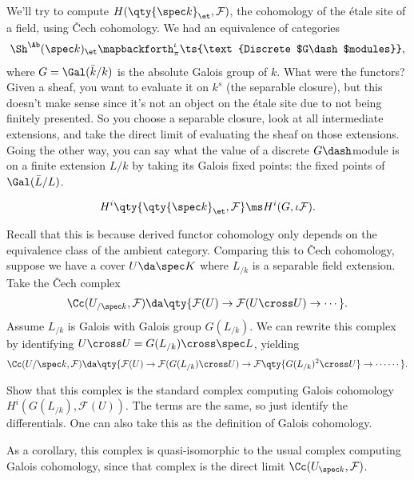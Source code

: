 \begin{example}[?]

We'll try to compute \(H(\qty{\spec k}_\et, \mathcal{F})\), the
cohomology of the étale site of a field, using Čech cohomology. We had
an equivalence of categories
\begin{align*}  
\Sh^\Ab(\spec k)_\et \mapbackforth^{\iota}_{\pi} \ts{\text{Discrete $G\dash$modules}}
,\end{align*} where \(G = \Gal(\bar k / k)\) is the absolute Galois
group of \(k\). What were the functors? Given a sheaf, you want to
evaluate it on \(k^s\) (the separable closure), but this doesn't make
sense since it's not an object on the étale site due to not being
finitely presented. So you choose a separable closure, look at all
intermediate extensions, and take the direct limit of evaluating the
sheaf on those extensions. Going the other way, you can say what the
value of a discrete \(G\dash\)module is on a finite extension \(L/k\) by
taking its Galois fixed points: the fixed points of \(\Gal(\bar L/L)\).

\begin{corollary}[?]

\begin{align*}  
H^i\qty{\qty{ \spec k}_\et, \mathcal{F}} \ms H^i(G, \iota \mathcal{F})
.\end{align*}

\end{corollary}

Recall that this is because derived functor cohomology only depends on
the equivalence class of the ambient category. Comparing this to Čech
cohomology, suppose we have a cover \(U \da \spec K\) where \(L_{/k}\)
is a separable field extension. Take the Čech complex
\begin{align*}  
\Cc(U_{/\spec k}, \mathcal{F}) \da \qty{\mathcal{F}(U) \to \mathcal{F}(U\cross U) \to \cdots}
.\end{align*} Assume \(L_{/k}\) is Galois with Galois group
\(G(L_{/k})\). We can rewrite this complex by identifying
\(U\cross U = G(L_{/k}) \cross \spec L\), yielding
\begin{align*}  
\Cc(U/\spec k, \mathcal{F}) \da \qty{\mathcal{F}(U) \to \mathcal{F}(G(L_{/k}) \cross U) \to \mathcal{F}\qty{G(L_{/k})^2 \cross U}
\to \cdots
\cdots}
.\end{align*}

\begin{exercise}[?]

Show that this complex is the standard complex computing Galois
cohomology \(H^i( G(L_{/k}), \mathcal{F}(U) )\). The terms are the same,
so just identify the differentials. One can also take this as the
definition of Galois cohomology.

\end{exercise}

As a corollary, this complex is quasi-isomorphic to the usual complex
computing Galois cohomology, since that complex is the direct limit
\(\Cc(U_{\spec k}, \mathcal{F})\).

\end{example}

